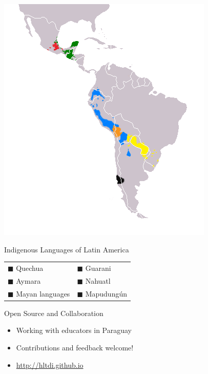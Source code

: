 \documentclass[final]{beamer}
\begin{document}
\begin{frame}{}
\begin{columns}[t]
\begin{column}{.32\linewidth}
  \centering
  \includegraphics[width=.50\linewidth]{Map-Most_Widely_Spoken_Native_Languages_in_Latin_America.png}
  \begin{block}{\large Indigenous Languages of Latin America}
    \begin{tabular}{ll}
      {\color{blue}        $\blacksquare$} Quechua &
      {\color{yellow}      $\blacksquare$} Guarani \\
      {\color{orange}      $\blacksquare$} Aymara &
      {\color{red}         $\blacksquare$} Nahuatl \\
      {\color{htmlgreen}   $\blacksquare$} Mayan languages &
      {\color{black}       $\blacksquare$} Mapudungún \\
    \end{tabular}
  \end{block}

  \begin{block}{\large Open Source and Collaboration}
    \centering
    \begin{itemize}
    \item Working with educators in Paraguay
    \item Contributions and feedback welcome!
    \item \url{http://hltdi.github.io}
    \end{itemize}
  \end{block}



\end{column}
\end{columns}
\end{frame}
\end{document}
